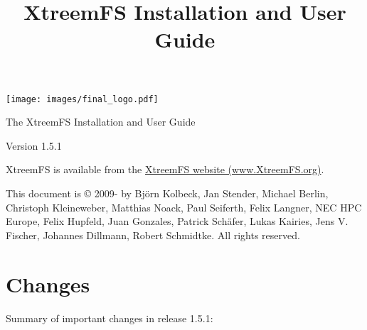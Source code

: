 \documentclass[a4paper,10pt]{book}
\title{XtreemFS Installation and User Guide}
\begin{document}
\begin{titlepage}
\begin{flushright}
 \texttt{[image: images/final\_logo.pdf]}
\end{flushright}

\vspace{3cm}

\begin{flushleft}
\sffamily \begin{LARGE}The XtreemFS Installation and User Guide\end{LARGE}

Version 1.5.1
\end{flushleft}


\end{titlepage}
\garamond
XtreemFS is available from the \href{http://www.XtreemFS.org}{XtreemFS website (www.XtreemFS.org)}.


This document is \copyright{} 2009-\the\year{} by Bj\"orn Kolbeck, Jan Stender, Michael Berlin, Christoph Kleineweber, Matthias Noack, Paul Seiferth, Felix Langner, NEC HPC Europe, Felix Hupfeld, Juan Gonzales, Patrick Sch\"afer, Lukas Kairies, Jens V. Fischer, Johannes Dillmann, Robert Schmidtke. All rights reserved.

\setcounter{tocdepth}{2}
\tableofcontents

\chapter*{Changes}

Summary of important changes in release 1.5.1:
\end{document}
